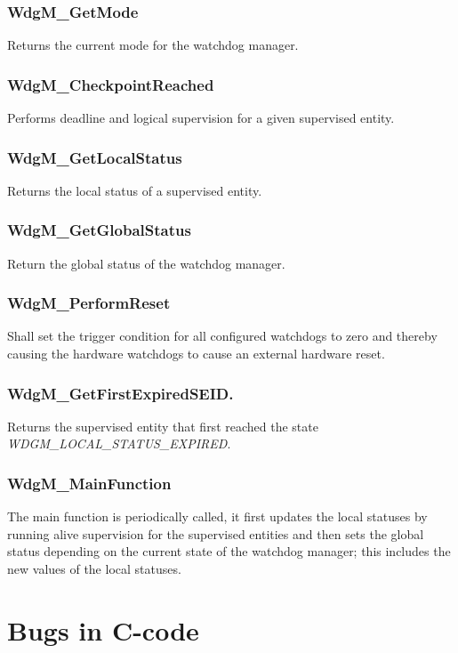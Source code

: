 \subsection{WdgM\_GetMode}
Returns the current mode for the watchdog manager\footnotemark[\thefootnote].
\subsection{WdgM\_CheckpointReached}
\label{SEC:CHECKPOINTREACHED}
Performs deadline and logical supervision for a given supervised entity.
\subsection{WdgM\_GetLocalStatus}
Returns the local status of a supervised entity\footnotemark[\thefootnote].
\subsection{WdgM\_GetGlobalStatus}
Return the global status of the watchdog manager\footnotemark[\thefootnote].
\subsection{WdgM\_PerformReset}
Shall set the trigger condition for all configured watchdogs to zero and
thereby causing the hardware watchdogs to cause an external hardware reset.
\subsection{WdgM\_GetFirstExpiredSEID.}
Returns the supervised entity that first reached the state
\emph{WDGM\_LOCAL\_STATUS\_EXPIRED}\footnotemark[\thefootnote].
\subsection{WdgM\_MainFunction}
\label{SEC:MAINFUNCTION}
The main function is periodically called, it first updates the local statuses by
running alive supervision for the supervised entities and then sets the global
status depending on the current state of the watchdog manager; this includes the
new values of the local statuses.


\setlength{\parindent}{0pt}
\chapter{Bugs in C-code}
